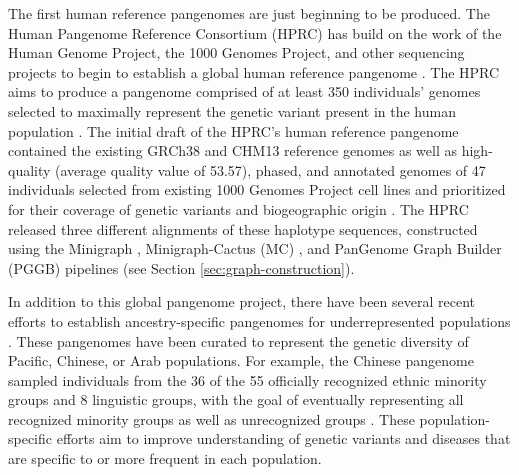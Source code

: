 \documentclass[11pt]{ucscthesis}
\begin{document}
The first human reference pangenomes are just beginning to be produced.
The Human Pangenome Reference Consortium (HPRC) has build on the work of the Human Genome Project, the 1000 Genomes Project, and other sequencing projects to begin to establish a global human reference pangenome \cite{hprc_2022}.
The HPRC aims to produce a pangenome comprised of at least 350 individuals' genomes selected to maximally represent the genetic variant present in the human population \cite{hprc_2022}.
The initial draft of the HPRC's human reference pangenome contained the existing GRCh38 and CHM13 reference genomes as well as high-quality (average quality value of 53.57), phased, and annotated genomes of 47 individuals selected from existing 1000 Genomes Project cell lines and prioritized for their coverage of genetic variants and biogeographic origin \cite{hprc_pangenome_2023}.
The HPRC released three different alignments of these haplotype sequences, constructed using the Minigraph \cite{li_minigraph_2020}, Minigraph-Cactus (MC) \cite{minigraph_cactus_2024}, and PanGenome Graph Builder (PGGB) \cite{pggb_2024} pipelines (see Section \ref{sec:graph-construction}). 

In addition to this global pangenome project, there have been several recent efforts to establish ancestry-specific pangenomes for underrepresented populations \cite{pacific_pangenome_2024,chinese_pangenome_2023,arab_pangenome_2024}.
These pangenomes have been curated to represent the genetic diversity of Pacific, Chinese, or Arab populations.
For example, the Chinese pangenome sampled individuals from the 36 of the 55 officially recognized ethnic minority groups and 8 linguistic groups, with the goal of eventually representing all recognized minority groups as well as unrecognized groups \cite{chinese_pangenome_2023}.
These population-specific efforts aim to improve understanding of genetic variants and diseases that are specific to or more frequent in each population.
\end{document}
